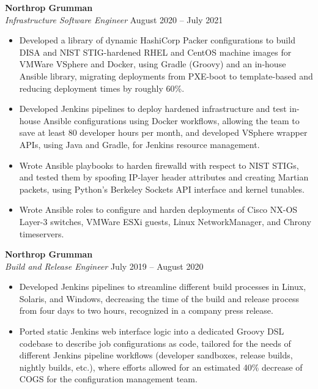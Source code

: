 \documentclass{res}
\begin{document}
\begin{resume}
\begin{itemize}
  \end{itemize}
\textbf{Northrop Grumman}\\
\textit{Infrastructure Software Engineer}
\hfill
August 2020 -- July 2021\\[1mm]
	\begin{itemize}
		\vspace{-3mm}
  \item Developed a library of dynamic HashiCorp Packer configurations to build DISA and NIST STIG-hardened RHEL and CentOS machine images for VMWare VSphere and Docker, using Gradle (Groovy) and an in-house Ansible library, migrating deployments from PXE-boot to template-based and reducing deployment times by roughly 60\%.
    \item Developed Jenkins pipelines to deploy hardened infrastructure and test in-house Ansible configurations using Docker workflows, allowing the team to save at least 80 developer hours per month, and developed VSphere wrapper APIs, using Java and Gradle, for Jenkins resource management.
    \item Wrote Ansible playbooks to harden firewalld with respect to NIST STIGs, and tested them by spoofing IP-layer header attributes and creating Martian packets, using Python's Berkeley Sockets API interface and kernel tunables.
    \item Wrote Ansible roles to configure and harden deployments of Cisco NX-OS Layer-3 switches, VMWare ESXi guests, Linux NetworkManager, and Chrony timeservers.
  \end{itemize}
\textbf{Northrop Grumman}\\
\textit{Build and Release Engineer}
\hfill
July 2019 -- August 2020\\[1mm]
	\begin{itemize}
		\vspace{-3mm}
    \item Developed Jenkins pipelines to streamline different build processes in Linux, Solaris, and Windows, decreasing the time of the build and release process from four days to two hours, recognized in a company press release.
    \item Ported static Jenkins web interface logic into a dedicated Groovy DSL codebase to describe job configurations as code, tailored for the needs of different Jenkins pipeline workflows (developer sandboxes, release builds, nightly builds, etc.), where efforts allowed for an estimated 40\% decrease of COGS for the configuration management team.

\end{itemize}
\end{resume}
\end{document}
